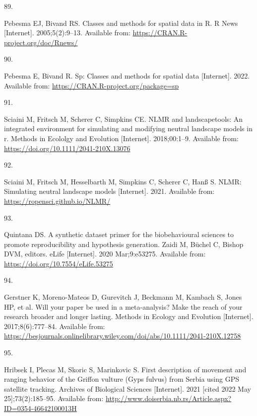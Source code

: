 \documentclass[10pt,a4paper]{article}
\newlength{\cslhangindent}
\newlength{\csllabelwidth}
\newlength{\cslentryspacingunit} %
\newenvironment{CSLReferences}[2] %
 {%
  \setlength{\parindent}{0pt}
  \ifodd #1
  \let\oldpar\par
  \def\par{\hangindent=\cslhangindent\oldpar}
  \fi
  \setlength{\parskip}{#2\cslentryspacingunit}
 }%
 {}
\newcommand{\CSLLeftMargin}[1]{\parbox[t]{\csllabelwidth}{#1}}
\newcommand{\CSLRightInline}[1]{\parbox[t]{\linewidth - \csllabelwidth}{#1}\break}
\begin{document}
\begin{CSLReferences}{0}{0}
\leavevmode{}%
\CSLLeftMargin{89. }
\CSLRightInline{Pebesma EJ, Bivand RS. Classes and methods for spatial data in {R}. R News {[}Internet{]}. 2005;5(2):9--13. Available from: \url{https://CRAN.R-project.org/doc/Rnews/}}

\leavevmode{}%
\CSLLeftMargin{90. }
\CSLRightInline{Pebesma E, Bivand R. Sp: Classes and methods for spatial data {[}Internet{]}. 2022. Available from: \url{https://CRAN.R-project.org/package=sp}}

\leavevmode{}%
\CSLLeftMargin{91. }
\CSLRightInline{Sciaini M, Fritsch M, Scherer C, Simpkins CE. NLMR and landscapetools: An integrated environment for simulating and modifying neutral landscape models in r. Methods in Ecololgy and Evolution {[}Internet{]}. 2018;00:1--9. Available from: \url{https://doi.org/10.1111/2041-210X.13076}}

\leavevmode{}%
\CSLLeftMargin{92. }
\CSLRightInline{Sciaini M, Fritsch M, Hesselbarth M, Simpkins C, Scherer C, Hanß S. NLMR: Simulating neutral landscape models {[}Internet{]}. 2021. Available from: \url{https://ropensci.github.io/NLMR/}}

\leavevmode{}%
\CSLLeftMargin{93. }
\CSLRightInline{Quintana DS. A synthetic dataset primer for the biobehavioural sciences to promote reproducibility and hypothesis generation. Zaidi M, Büchel C, Bishop DVM, editors. eLife {[}Internet{]}. 2020 Mar;9:e53275. Available from: \url{https://doi.org/10.7554/eLife.53275}}

\leavevmode{}%
\CSLLeftMargin{94. }
\CSLRightInline{Gerstner K, Moreno-Mateos D, Gurevitch J, Beckmann M, Kambach S, Jones HP, et al. Will your paper be used in a meta-analysis? Make the reach of your research broader and longer lasting. Methods in Ecology and Evolution {[}Internet{]}. 2017;8(6):777--84. Available from: \url{https://besjournals.onlinelibrary.wiley.com/doi/abs/10.1111/2041-210X.12758}}

\leavevmode{}%
\CSLLeftMargin{95. }
\CSLRightInline{Hribsek I, Plecas M, Skoric S, Marinkovic S. First description of movement and ranging behavior of the {Griffon} vulture ({Gyps} fulvus) from {Serbia} using {GPS} satellite tracking. Archives of Biological Sciences {[}Internet{]}. 2021 {[}cited 2022 May 25{]};73(2):185--95. Available from: \url{http://www.doiserbia.nb.rs/Article.aspx?ID=0354-46642100013H}}


\end{CSLReferences}
\end{document}
